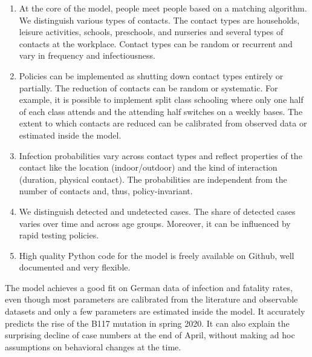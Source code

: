 \begin{enumerate}
    \item At the core of the model, people meet people based on a matching algorithm. We
          distinguish various types of contacts. The contact types are households,
          leisure activities, schools, preschools, and nurseries and several types of
          contacts at the workplace. Contact types can be random or recurrent and vary
          in frequency and infectiousness.

    \item Policies can be implemented as shutting down contact types entirely or
          partially. The reduction of contacts can be random or systematic. For example,
          it is possible to implement split class schooling where only one half of each
          class attends and the attending half switches on a weekly bases. The extent to
          which contacts are reduced can be calibrated from observed data or estimated
          inside the model.

    \item Infection probabilities vary across contact types and reflect properties of
          the contact like the location (indoor/outdoor) and the kind of interaction
          (duration, physical contact). The probabilities are independent from the
          number of contacts and, thus, policy-invariant.

    \item We distinguish detected and undetected cases. The share of detected cases
          varies over time and across age groups. Moreover, it can be influenced by rapid
          testing policies.

    \item High quality Python code for the model is freely available on Github, well
          documented and very flexible\footnotemark.
\end{enumerate}


The model achieves a good fit on German data of infection and fatality rates, even
though most parameters are calibrated from the literature and observable datasets and
only a few parameters are estimated inside the model. It accurately predicts the rise of
the B117 mutation in spring 2020. It can also explain the surprising decline of case
numbers at the end of April, without making ad hoc assumptions on behavioral changes at
the time.

